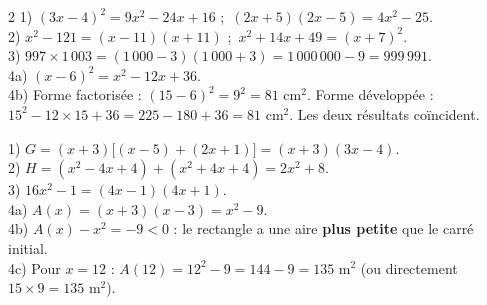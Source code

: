 \begin{multicols}{2}
1) $(3x-4)^{2}=9x^{2}-24x+16$ ;\ $(2x+5)(2x-5)=4x^{2}-25$.\\
2) $x^{2}-121=(x-11)(x+11)$ ;\ $x^{2}+14x+49=(x+7)^{2}$.\\
3) $997\times1\,003=(1\,000-3)(1\,000+3)=1\,000\,000-9=999\,991$.\\
4a) $(x-6)^{2}=x^{2}-12x+36$.\\
4b) Forme factorisée : $(15-6)^{2}=9^{2}=81\text{ cm}^2$. Forme développée :
$15^{2}-12\times15+36=225-180+36=81\text{ cm}^2$. Les deux résultats coïncident.

1) $G=(x+3)\big[(x-5)+(2x+1)\big]=(x+3)(3x-4)$.\\
2) $H=(x^{2}-4x+4)+(x^{2}+4x+4)=2x^{2}+8$.\\
3) $16x^{2}-1=(4x-1)(4x+1)$.\\
4a) $A(x)=(x+3)(x-3)=x^{2}-9$.\\
4b) $A(x)-x^{2}=-9<0$ : le rectangle a une aire \textbf{plus petite} que le carré initial.\\
4c) Pour $x=12$ : $A(12)=12^{2}-9=144-9=135\text{ m}^{2}$ (ou directement
$15\times9=135\text{ m}^{2}$).

\end{multicols}
\exercicesBanner
